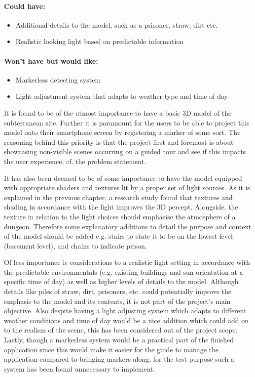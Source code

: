 \paragraph{Could have:}
\begin{itemize}
\item Additional details to the model, such as a prisoner, straw, dirt etc.
\item Realistic looking light based on predictable information
\end{itemize}

\paragraph{Won’t have but would like:}
\begin{itemize}
\item Markerless detecting system
\item Light adjustment system that adapts to weather type and time of day
\end{itemize}

It is found to be of the utmost importance to have a basic 3D model of the subterranean site. Further it is paramount for the users to be able to project this model onto their smartphone screen by registering a marker of some sort. The reasoning behind this priority is that the project first and foremost is about showcasing non-visible scenes occurring on a guided tour and see if this impacts the user experience, cf. the problem statement. 

It has also been deemed to be of some importance to have the model equipped with appropriate shaders and textures lit by a proper set of light sources. As it is explained in the previous chapter, a research study found that textures and shading in accordance with the light improves the 3D percept. Alongside, the texture in relation to the light choices should emphasise the atmosphere of a dungeon. Therefore some explanatory additions to detail the purpose and context of the model should be added e.g. stairs to state it to be on the lowest level (basement level), and chains to indicate prison. 

Of less importance is considerations to a realistic light setting in accordance with the predictable environmentals (e.g. existing buildings and sun orientation at a specific time of day) as well as higher levels of details to the model. Although details like piles of straw, dirt, prisoners, etc. could potentially improve the emphasis to the model and its contents, it is not part of the project’s main objective. Also despite having a light adjusting system which adapts to different weather conditions and time of day would be a nice addition which could add on to the realism of the scene, this has been considered out of the project scope. Lastly, though a markerless system would be a practical part of the finished application since this would make it easier for the guide to manage the application compared to bringing markers along, for the test purpose such a system has been found unnecessary to implement.

